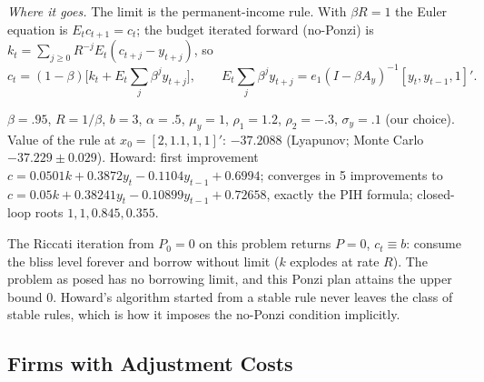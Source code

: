 \documentclass[12pt, letterpaper]{article}
\begin{document}
\begin{tcolorbox}[evenbox,title={Exercise 5.10 \quad Valuing a rule of thumb, then improving it}]
\emph{Where it goes.} The limit is the permanent-income rule. With $\beta R=1$ the Euler equation
is $E_tc_{t+1}=c_t$; the budget iterated forward (no-Ponzi) is
$k_t=\sum_{j\ge0}R^{-j}E_t(c_{t+j}-y_{t+j})$, so
\[
c_t=(1-\beta)\Big[k_t+E_t\sum_j\beta^jy_{t+j}\Big],\qquad E_t\sum_j\beta^jy_{t+j}=e_1(I-\beta A_y)^{-1}[y_t,y_{t-1},1]'.
\]

\begin{tcolorbox}[databox]
$\beta=.95$, $R=1/\beta$, $b=3$, $\alpha=.5$, $\mu_y=1$, $\rho_1=1.2$, $\rho_2=-.3$, $\sigma_y=.1$ (our
choice). Value of the rule at $x_0=[2,1.1,1,1]'$: $-37.2088$ (Lyapunov; Monte Carlo
$-37.229\pm0.029$). Howard: first improvement $c=0.0501k+0.3872y_t-0.1104y_{t-1}+0.6994$; converges
in 5 improvements to $c=0.05k+0.38241y_t-0.10899y_{t-1}+0.72658$, exactly the PIH formula;
closed-loop roots $1,1,0.845,0.355$.
\end{tcolorbox}
\begin{tcolorbox}[trapbox]
The Riccati iteration from $P_0=0$ on this problem returns $P=0$, $c_t\equiv b$: consume the bliss
level forever and borrow without limit ($k$ explodes at rate $R$). The problem as posed has no
borrowing limit, and this Ponzi plan attains the upper bound 0. Howard's algorithm started from a
stable rule never leaves the class of stable rules, which is how it imposes the no-Ponzi condition
implicitly.
\end{tcolorbox}
\end{tcolorbox}

\subsection{Firms with Adjustment Costs}
\end{document}

